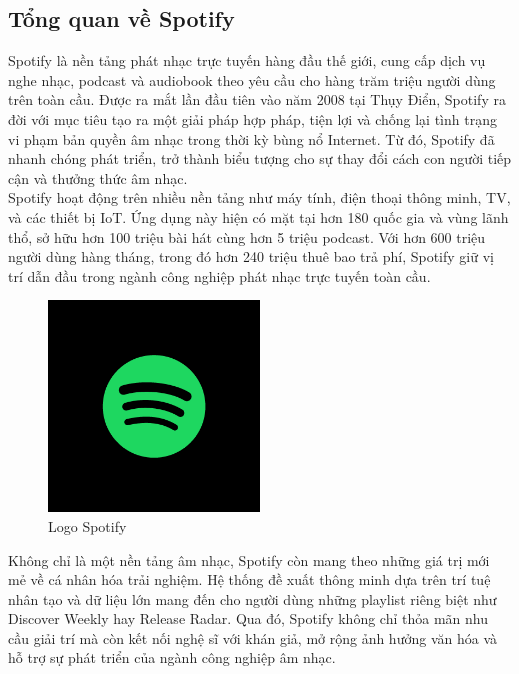 \documentclass{latex/hcmut-report}
\begin{document}
\subsection{Tổng quan về Spotify }
Spotify là nền tảng phát nhạc trực tuyến hàng đầu thế giới, cung cấp dịch vụ nghe nhạc, podcast và audiobook theo yêu cầu cho hàng trăm triệu người dùng trên toàn cầu. Được ra mắt lần đầu tiên vào năm 2008 tại Thụy Điển, Spotify ra đời với mục tiêu tạo ra một giải pháp hợp pháp, tiện lợi và chống lại tình trạng vi phạm bản quyền âm nhạc trong thời kỳ bùng nổ Internet. Từ đó, Spotify đã nhanh chóng phát triển, trở thành biểu tượng cho sự thay đổi cách con người tiếp cận và thưởng thức âm nhạc.\\

Spotify hoạt động trên nhiều nền tảng như máy tính, điện thoại thông minh, TV, và các thiết bị IoT. Ứng dụng này hiện có mặt tại hơn 180 quốc gia và vùng lãnh thổ, sở hữu hơn 100 triệu bài hát cùng hơn 5 triệu podcast. Với hơn 600 triệu người dùng hàng tháng, trong đó hơn 240 triệu thuê bao trả phí, Spotify giữ vị trí dẫn đầu trong ngành công nghiệp phát nhạc trực tuyến toàn cầu.\\

\begin{figure}[h] %
    \centering %
    \includegraphics[width=0.5\textwidth]{graphics/spotify_logo.png} %
    \caption{Logo Spotify} %
    \label{fig:example} %
\end{figure}

Không chỉ là một nền tảng âm nhạc, Spotify còn mang theo những giá trị mới mẻ về cá nhân hóa trải nghiệm. Hệ thống đề xuất thông minh dựa trên trí tuệ nhân tạo và dữ liệu lớn mang đến cho người dùng những playlist riêng biệt như Discover Weekly hay Release Radar. Qua đó, Spotify không chỉ thỏa mãn nhu cầu giải trí mà còn kết nối nghệ sĩ với khán giả, mở rộng ảnh hưởng văn hóa và hỗ trợ sự phát triển của ngành công nghiệp âm nhạc.\\
\end{document}
